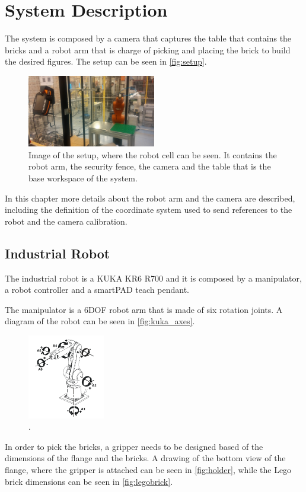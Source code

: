 \chapter{System Description}\label{chap:systemDescription}
The system is composed by a camera that captures the table that contains the bricks and a robot arm that is charge of picking and placing the brick to build the desired figures. The setup can be seen in \autoref{fig:setup}.
\begin{figure}[H]
    \includegraphics[width=0.5\textwidth]{figures/setup}
    \caption{Image of the setup, where the robot cell can be seen. It contains the robot arm, the security fence, the camera and the table that is the base workspace of the system. }
    \label{fig:setup}
\end{figure}
In this chapter more details about the robot arm and the camera are described, including the definition of the coordinate system used to send references to the robot and the camera calibration. 

\section{Industrial Robot}
The industrial robot is a KUKA KR6 R700 and it is composed by a manipulator, a robot controller and a smartPAD teach pendant. 

The manipulator is a 6DOF robot arm that is made of six rotation joints. A diagram of the robot can be seen in \autoref{fig:kuka_axes}.
\begin{figure}[H]
    \includegraphics[width=0.3\textwidth]{figures/kuka_axes.png}
    \caption{.\cite{kuka} }
    \label{fig:kuka_axes}
\end{figure}
In order to pick the bricks, a gripper needs to be designed based of the dimensions of the flange and the bricks. A drawing of the bottom view of the flange, where the gripper is attached can be seen in \autoref{fig:holder}, while the Lego brick dimensions can be seen in \autoref{fig:legobrick}.

